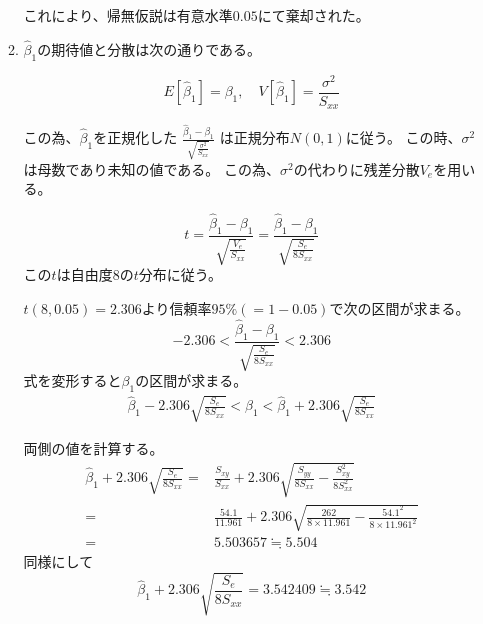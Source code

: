 \documentclass[12pt,b5paper]{ltjsarticle}
\begin{document}
\begin{enumerate}
\begin{enumerate}
            これにより、帰無仮説は有意水準$0.05$にて棄却された。


       \item

            $\hat{\beta}_1$の期待値と分散は次の通りである。

            \begin{equation}
             E[\hat{\beta}_1]=\beta_1,
              \quad V[\hat{\beta}_1]=\frac{\sigma^2}{S_{xx}}
            \end{equation}

            この為、$\hat{\beta}_1$を正規化した
            $\frac{\hat{\beta}_1-\beta_1}{\sqrt{\frac{\sigma^2}{S_{xx}}}}$
            は正規分布$N(0,1)$に従う。
            この時、$\sigma^2$は母数であり未知の値である。
            この為、$\sigma^2$の代わりに残差分散$V_e$を用いる。



            \begin{equation}
             t=
             \frac{\hat{\beta}_1-\beta_1}{\sqrt{\frac{V_e}{S_{xx}}}}
              =\frac{\hat{\beta}_1-\beta_1}{\sqrt{\frac{S_e}{8S_{xx}}}}
            \end{equation}
            この$t$は自由度8の$t$分布に従う。


            $t(8,0.05)=2.306$より信頼率$95\% (=1-0.05)$で次の区間が求まる。
            \begin{equation}
             -2.306 < \frac{\hat{\beta}_1-\beta_1}{\sqrt{\frac{S_e}{8S_{xx}}}} < 2.306
            \end{equation}
            式を変形すると$\beta_1$の区間が求まる。
            \begin{gather}
             \hat{\beta}_1 - 2.306\sqrt{\frac{S_e}{8S_{xx}}}
             < \beta_1
             < \hat{\beta}_1 + 2.306\sqrt{\frac{S_e}{8S_{xx}}}
            \end{gather}

            両側の値を計算する。
            \begin{align}
             \hat{\beta}_1 + 2.306\sqrt{\frac{S_e}{8S_{xx}}}
             =& \frac{S_{xy}}{S_{xx}} + 2.306\sqrt{ \frac{S_{yy}}{8S_{xx}}-\frac{S_{xy}^2}{8S_{xx}^2} }\\
             =& \frac{54.1}{11.961} + 2.306\sqrt{ \frac{262}{8\times 11.961}-\frac{54.1^2}{8\times 11.961^2} }\\
             =& 5.503657 \fallingdotseq 5.504
            \end{align}
            同様にして
            \begin{equation}
             \hat{\beta}_1 + 2.306\sqrt{\frac{S_e}{8S_{xx}}}
              = 3.542409 \fallingdotseq 3.542
            \end{equation}


\end{enumerate}
\end{enumerate}
\end{document}
